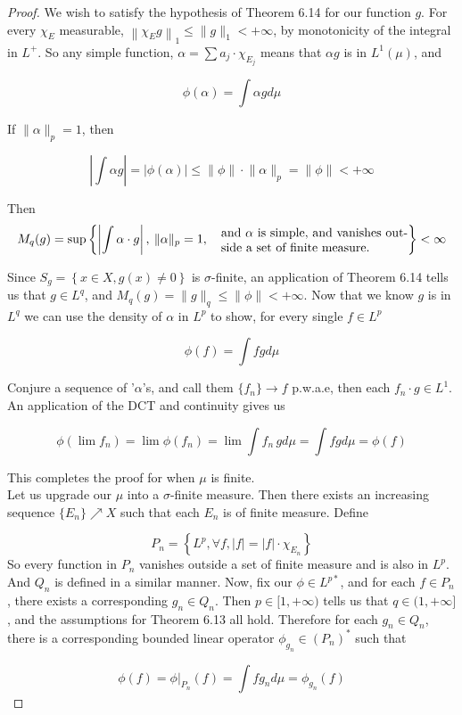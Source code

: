 \documentclass[../../main.tex]{subfiles}
\begin{document}
\begin{proof}
We wish to satisfy the hypothesis of Theorem 6.14 for our function $g$. For every $\chi_E$ measurable, $\left\lVert \chi_E g\right\rVert_1\leq \lVert g\rVert_1<+\infty$, by monotonicity of the integral in $L^+$. So any simple function, $\alpha = \sum a_j\cdot\chi_{E_j}$ means that $\alpha g$ is in $L^1(\mu)$, and

\[
\phi(\alpha) = \int \alpha g d\mu
\]

If $\lVert \alpha \rVert_p = 1$, then 

$$
\left|\int\alpha g\right| = \left|\phi(\alpha)\right| \leq \lVert \phi \rVert\cdot \lVert \alpha\rVert_p  = \lVert \phi \rVert < +\infty
$$

Then 
\[M_q(g) = \sup\left\{\left|\int \alpha\cdot g\right|,\: \lVert \alpha \rVert_p = 1,\quad  \parbox{15em}{ and $\alpha$ is simple, and vanishes outside a set of finite measure.}\right\}<\infty\]

Since $S_g = \left\{x\in X, g(x) \neq 0\right\}$ is $\sigma$-finite, an application of Theorem 6.14 tells us that $g\in L^q$, and $M_q(g) = \lVert g \rVert_q\leq \lVert \phi \rVert<+\infty$. Now that we know $g$ is in $L^q$ we can use the density of $\alpha$ in $L^p$ to show, for every single $f\in L^p$

\[
\phi(f) = \int fg d\mu
\]

Conjure a sequence of '$\alpha$'s, and call them $\{f_n\} \to f$ p.w.a.e, then each $f_n\cdot g\in L^1$. An application of the DCT and continuity gives us

\[
\phi(\lim f_n) = \lim\phi(f_n) = \lim \int f_n\,gd\mu = \int fgd\mu=\phi(f)
\]

This completes the proof for when $\mu$ is finite.\\[2ex]

Let us upgrade our $\mu$ into a $\sigma$-finite measure. Then there exists an increasing sequence $\{E_n\}\nearrow X$ such that each $E_n$ is of finite measure. Define 

\[
P_n = \left\{L^p, \forall f, |f| = |f|\cdot\chi_{E_n}\right\}
\]
So every function in $P_n$ vanishes outside a set of finite measure and is also in $L^p$. And $Q_n$ is defined in a similar manner. Now, fix our $\phi\in L^{p*}$, and for each $f\in P_n$, there exists a corresponding $g_n\in Q_n$. Then $p\in[1,+\infty)$ tells us that $q\in ( 1,+\infty]$, and the assumptions for Theorem 6.13 all hold. Therefore for each $g_n\in Q_n$, there is a corresponding  bounded linear operator $\phi_{g_n} \in (P_n)^*$ such that 

\[
\phi(f) = \phi|_{P_n}(f) = \int fg_n d\mu = \phi_{g_n}(f)
\]


\end{proof}
\end{document}
